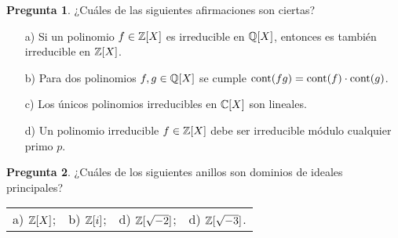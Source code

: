 \documentclass{article}
\theoremstyle{definition}
\newtheorem{pregunta}{Pregunta}
\begin{document}
\begin{pregunta}
  ¿Cuáles de las siguientes afirmaciones son ciertas?

  \begin{enumerate}
  \item[a)] Si un polinomio $f \in \mathbb{Z} [X]$ es irreducible en $\mathbb{Q} [X]$,
    entonces es también irreducible en $\mathbb{Z} [X]$.

  \item[b)] Para dos polinomios $f,g \in \mathbb{Q} [X]$ se cumple
    $\operatorname{cont} (fg) = \operatorname{cont} (f)\cdot \operatorname{cont} (g)$.

  \item[c)] Los únicos polinomios irreducibles en $\mathbb{C} [X]$ son lineales.
    
  \item[d)] Un polinomio irreducible $f \in \mathbb{Z} [X]$ debe ser irreducible módulo
    cualquier primo $p$.
  \end{enumerate}
\end{pregunta}

\vspace{3em}

\begin{pregunta}
  ¿Cuáles de los siguientes anillos son dominios de ideales principales?

  \begin{center}
    \begin{tabular}{x{3cm}x{3cm}x{3cm}x{3cm}}
      a) $\mathbb{Z} [X]$; & b) $\mathbb{Z}[i]$; & d) $\mathbb{Z}[\sqrt{-2}]$; & d) $\mathbb{Z}[\sqrt{-3}]$.
    \end{tabular}
  \end{center}
\end{pregunta}

\vspace{3em}
\end{document}
